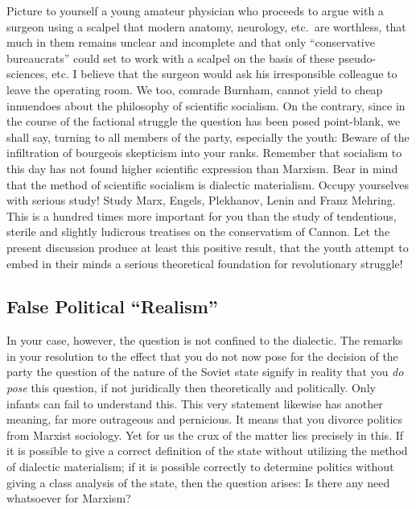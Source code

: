 Picture to yourself a young amateur physician who proceeds to argue with a surgeon using a scalpel that modern anatomy, neurology, etc.\ are worthless, that much in them remains unclear and incomplete and that only “conservative bureaucrats” could set to work with a scalpel on the basis of these pseudo-sciences, etc. I believe that the surgeon would ask his irresponsible colleague to leave the operating room. We too, comrade Burnham, cannot yield to cheap innuendoes about the philosophy of scientific socialism. On the contrary, since in the course of the factional struggle the question has been posed point-blank, we shall say, turning to all members of the party, especially the youth: Beware of the infiltration of bourgeois skepticism into your ranks. Remember that socialism to this day has not found higher scientific expression than Marxism. Bear in mind that the method of scientific socialism is dialectic materialism. Occupy yourselves with serious study! Study Marx, Engels, Plekhanov, Lenin and Franz Mehring. This is a hundred times more important for you than the study of tendentious, sterile and slightly ludicrous treatises on the conservatism of Cannon. Let the present discussion produce at least this positive result, that the youth attempt to embed in their minds a serious theoretical foundation for revolutionary struggle!

\subsection*{False Political “Realism”}

In your case, however, the question is not confined to the dialectic. The remarks in your resolution to the effect that you do not now pose for the decision of the party the question of the nature of the Soviet state signify in reality that you \emph{do pose} this question, if not juridically then theoretically and politically. Only infants can fail to understand this. This very statement likewise has another meaning, far more outrageous and pernicious. It means that you divorce politics from Marxist sociology. Yet for us the crux of the matter lies precisely in this. If it is possible to give a correct definition of the state without utilizing the method of dialectic materialism; if it is possible correctly to determine politics without giving a class analysis of the state, then the question arises: Is there any need whatsoever for Marxism?

